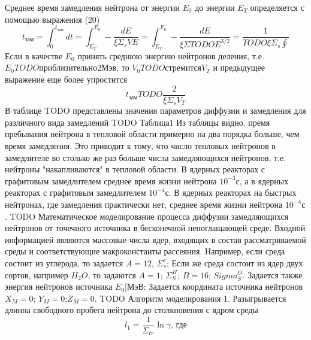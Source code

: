 \documentclass[a4paper]{article}
\begin{document}
    \newline
    Среднее время замедления нейтрона от энергии $E_0$ до энергии
    $E_T$ определяется с помощью выражения (20)
    \begin{equation}\nonumber
        t_\text{зам} = \int_0^{t_\text{зам}} dt =
        \int_{E_T}^{E_0} - \frac{dE}{\xi \Sigma_s VE} =
        \int_{E_T}^{E_0} - \frac{dE}{\xi \Sigma TODO E^{3/2}} =
        \frac{1}{TODO \xi \Sigma_s \oint}
    \end{equation}
    Если в качестве $E_0$ принять среднюю энергию нейтронов деления,
    т.е. \(E_0 TODO{приблизительно} 2\text{Мэв}\), то \(V_0 TODO{стремится} V_T\)
    и предыдущее выражение еще более упростится
    \begin{equation}\label{e_28}\tag{28}
        t_\text{зам} TODO \frac{2}{\xi\Sigma_s V_T}
    \end{equation}
    В таблице TODO представлены значения параметров диффузии и
    замедления для различного вида замедлений
    TODO Таблица1
    Из таблицы видно, премя пребывания нейтрона в тепловой области
    примерно на два порядка больше, чем время замедления. Это
    приводит к тому, что число тепловых нейтронов в замедлителе во
    столько же раз больше числа замедляющихся нейтронов, т.е.
    нейтроны "накапливаются" в тепловой области. В ядерных реакторах
    с графитовым замедлителем среднее время жизни нейтрона
    $10^{-3}\text{с}$, а в ядерных реакторах с графитовым
    замедлителем $10^{-4}\text{с}$. В ядерных реакторах на быстрых
    нейтронах, где замедления практически нет, среднее время жизни
    нейтрона $10^{-4}\text{с}$.
    TODO Математическое моделирование процесса диффузии замедляющихся
    нейтронов от точечного источника в бесконечной непоглащающей
    среде.
    \newline
    Входной информацией являются массовые числа ядер, входящих в
    состав рассматриваемой среды и соответствующие макроконстанты
    рассеяния. Например, если среда состоит из углерода, то задается
    \(A=12\), $\Sigma_s^c$; Если же среда состоит из ядер двух
    сортов, например $H_2 O$, то задаются \(A=1\); $\Sigma_S^H$;
    \(B=16\); $Sigma_S^O$. Задается также энергия нейтронов
    источника $E_0[\text{МэВ}$; Задается координата источника
    нейтронов \(X_M=0\); \(Y_M=0\);\(Z_M=0\).
    TODO Алгоритм моделирования
    1. Разыгрывается длинна свободного пробега нейтрона до
    столкновения с ядром среды
    \begin{equation}\nonumber
        l_1=\frac{1}{\Sigma_{tr}}\ln{\gamma}\text{, где}
    \end{equation}
\end{document}
